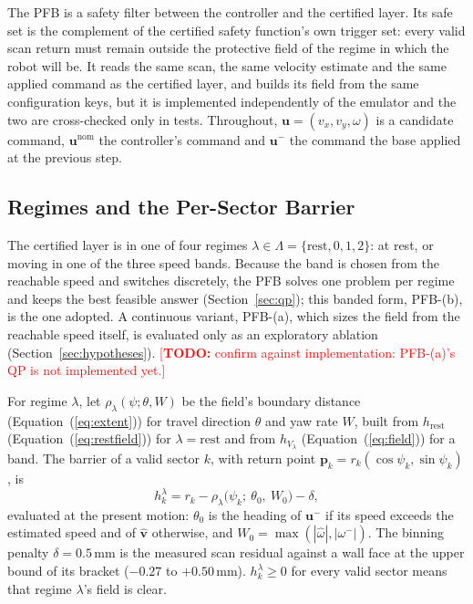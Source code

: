 \documentclass[sensors,article,submit,moreauthors]{Definitions/mdpi}
\newcommand{\todo}[1]{\textcolor{red}{[\textbf{TODO:} #1]}}
\begin{document}
The PFB is a safety filter between the controller and the certified layer. Its safe set is the complement of the certified safety function's own trigger set: every valid scan return must remain outside the protective field of the regime in which the robot will be. It reads the same scan, the same velocity estimate and the same applied command as the certified layer, and builds its field from the same configuration keys, but it is implemented independently of the emulator and the two are cross-checked only in tests. Throughout, $\mathbf{u} = (v_x, v_y, \omega)$ is a candidate command, $\mathbf{u}^{\text{nom}}$ the controller's command and $\mathbf{u}^{-}$ the command the base applied at the previous step.

\subsection{Regimes and the Per-Sector Barrier}\label{sec:barrier}

The certified layer is in one of four regimes $\lambda \in \Lambda = \{\text{rest}, 0, 1, 2\}$: at rest, or moving in one of the three speed bands. Because the band is chosen from the reachable speed and switches discretely, the PFB solves one problem per regime and keeps the best feasible answer (Section~\ref{sec:qp}); this banded form, PFB-(b), is the one adopted. A continuous variant, PFB-(a), which sizes the field from the reachable speed itself, is evaluated only as an exploratory ablation (Section~\ref{sec:hypotheses}). \todo{confirm against implementation: PFB-(a)'s QP is not implemented yet.}

For regime $\lambda$, let $\rho_\lambda(\psi;\theta,W)$ be the field's boundary distance (Equation~(\ref{eq:extent})) for travel direction $\theta$ and yaw rate $W$, built from $h_{\text{rest}}$ (Equation~(\ref{eq:restfield})) for $\lambda = \text{rest}$ and from $h_{V_\lambda}$ (Equation~(\ref{eq:field})) for a band. The barrier of a valid sector $k$, with return point $\mathbf{p}_k = r_k(\cos\psi_k, \sin\psi_k)$, is
\begin{equation}
h^\lambda_k = r_k - \rho_\lambda\big(\psi_k;\ \theta_0,\ W_0\big) - \delta,
\label{eq:barrier}
\end{equation}
evaluated at the present motion: $\theta_0$ is the heading of $\mathbf{u}^{-}$ if its speed exceeds the estimated speed and of $\hat{\mathbf{v}}$ otherwise, and $W_0 = \max(|\hat\omega|, |\omega^{-}|)$. The binning penalty $\delta = 0.5$\,mm is the measured scan residual against a wall face at the upper bound of its bracket ($-0.27$ to $+0.50$\,mm). $h^\lambda_k \ge 0$ for every valid sector means that regime $\lambda$'s field is clear.
\end{document}
